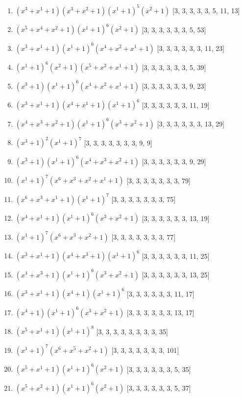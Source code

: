\documentclass[10pt,twocolumn]{article}
\begin{document}
\begin{enumerate}
\item $(x^{3} + x^{1} + 1)(x^{3} + x^{2} + 1)(x^{1} + 1)^{5}(x^{2} + 1)$  [3, 3, 3, 3, 3, 5, 11, 13]
\item $(x^{5} + x^{4} + x^{2} + 1)(x^{1} + 1)^{6}(x^{2} + 1)$  [3, 3, 3, 3, 3, 3, 5, 53]
\item $(x^{3} + x^{1} + 1)(x^{1} + 1)^{6}(x^{4} + x^{2} + x^{1} + 1)$  [3, 3, 3, 3, 3, 3, 11, 23]
\item $(x^{1} + 1)^{6}(x^{2} + 1)(x^{5} + x^{2} + x^{1} + 1)$  [3, 3, 3, 3, 3, 3, 5, 39]
\item $(x^{3} + 1)(x^{1} + 1)^{6}(x^{4} + x^{2} + x^{1} + 1)$  [3, 3, 3, 3, 3, 3, 9, 23]
\item $(x^{3} + x^{1} + 1)(x^{4} + x^{1} + 1)(x^{1} + 1)^{6}$  [3, 3, 3, 3, 3, 3, 11, 19]
\item $(x^{4} + x^{3} + x^{2} + 1)(x^{1} + 1)^{6}(x^{3} + x^{2} + 1)$  [3, 3, 3, 3, 3, 3, 13, 29]
\item $(x^{3} + 1)^{2}(x^{1} + 1)^{7}$  [3, 3, 3, 3, 3, 3, 3, 9, 9]
\item $(x^{3} + 1)(x^{1} + 1)^{6}(x^{4} + x^{3} + x^{2} + 1)$  [3, 3, 3, 3, 3, 3, 9, 29]
\item $(x^{1} + 1)^{7}(x^{6} + x^{3} + x^{2} + x^{1} + 1)$  [3, 3, 3, 3, 3, 3, 3, 79]
\item $(x^{6} + x^{3} + x^{1} + 1)(x^{1} + 1)^{7}$  [3, 3, 3, 3, 3, 3, 3, 75]
\item $(x^{4} + x^{1} + 1)(x^{1} + 1)^{6}(x^{3} + x^{2} + 1)$  [3, 3, 3, 3, 3, 3, 13, 19]
\item $(x^{1} + 1)^{7}(x^{6} + x^{3} + x^{2} + 1)$  [3, 3, 3, 3, 3, 3, 3, 77]
\item $(x^{3} + x^{1} + 1)(x^{4} + x^{3} + 1)(x^{1} + 1)^{6}$  [3, 3, 3, 3, 3, 3, 11, 25]
\item $(x^{4} + x^{3} + 1)(x^{1} + 1)^{6}(x^{3} + x^{2} + 1)$  [3, 3, 3, 3, 3, 3, 13, 25]
\item $(x^{3} + x^{1} + 1)(x^{4} + 1)(x^{1} + 1)^{6}$  [3, 3, 3, 3, 3, 3, 11, 17]
\item $(x^{4} + 1)(x^{1} + 1)^{6}(x^{3} + x^{2} + 1)$  [3, 3, 3, 3, 3, 3, 13, 17]
\item $(x^{5} + x^{1} + 1)(x^{1} + 1)^{8}$  [3, 3, 3, 3, 3, 3, 3, 3, 35]
\item $(x^{1} + 1)^{7}(x^{6} + x^{5} + x^{2} + 1)$  [3, 3, 3, 3, 3, 3, 3, 101]
\item $(x^{5} + x^{1} + 1)(x^{1} + 1)^{6}(x^{2} + 1)$  [3, 3, 3, 3, 3, 3, 5, 35]
\item $(x^{5} + x^{2} + 1)(x^{1} + 1)^{6}(x^{2} + 1)$  [3, 3, 3, 3, 3, 3, 5, 37]

\end{enumerate}
\end{document}
